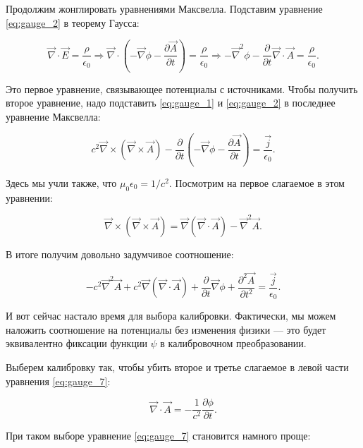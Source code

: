 \documentclass[11pt,a4paper]{article}
\numberwithin{equation}{section}
\newcommand{\pt}{\partial}
\newcommand{\vn}{\vec{\nabla}}
\newcommand{\eps}{\epsilon}
\begin{document}
Продолжим жонглировать уравнениями Максвелла. Подставим уравнение
\eqref{eq:gauge_2} в теорему Гаусса:

\begin{equation}
  \label{eq:gauge_4}
  \vn \cdot \vec{E} = \frac{\rho}{\eps_0} \Rightarrow \vn \cdot \left(
   -\vn \phi - \frac{\pt \vec{A}}{\pt t} \right) =
 \frac{\rho}{\eps_0} \Rightarrow -\vn^2 \phi - \frac{\pt}{\pt t} \vn
 \cdot \vec{A} = \frac{\rho}{\eps_0}.
\end{equation}

Это первое уравнение, связывающее потенциалы с источниками. Чтобы
получить второе уравнение, надо подставить \eqref{eq:gauge_1} и
\eqref{eq:gauge_2} в последнее уравнение Максвелла:

\begin{equation}
  \label{eq:gauge_5}
  c^2 \vn \times (\vn \times \vec{A}) - \frac{\pt}{\pt t} \left(
  -\vn \phi - \frac{\pt \vec{A}}{\pt t}\right) = \frac{\vec{j}}{\eps_0}.
\end{equation}

Здесь мы учли также, что $\mu_0 \eps_0 =1 /c^2$. Посмотрим на первое
слагаемое в этом уравнении:

\begin{equation}
  \label{eq:gauge_6}
  \vn \times (\vn \times \vec{A}) = \vn (\vn \cdot \vec{A}) - \vn^2 \vec{A}.
\end{equation}

В итоге получим довольно задумчивое соотношение: 

\begin{equation}
  \label{eq:gauge_7}
  -c^2 \vn^2 \vec{A} + c^2 \vn (\vn \cdot \vec{A}) + \frac{\pt}{\pt t}
  \vn \phi + \frac{\pt^2 \vec{A}}{\pt t^2} = \frac{\vec{j}}{\eps_0}.
\end{equation}

И вот сейчас настало время для выбора калибровки. Фактически, мы можем
наложить соотношение на потенциалы без изменения физики --- это будет
эквивалентно фиксации функции $\psi$ в калибровочном преобразовании. 

Выберем калибровку так, чтобы убить второе и третье слагаемое в левой
части уравнения \eqref{eq:gauge_7}:

\begin{equation}
  \label{eq:gauge_fix}
  \vn \cdot \vec{A} = -\frac{1}{c^2} \frac{\pt \phi}{\pt t}.
\end{equation}

При таком выборе уравнение \eqref{eq:gauge_7} становится намного
проще: 
\end{document}

